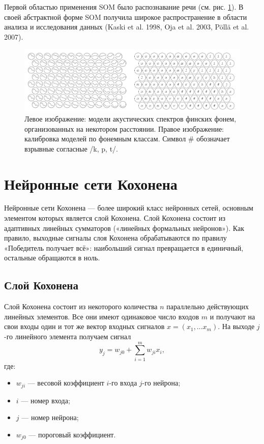 \documentclass[a4paper,12pt]{article}
\begin{document}
Первой областью применения SOM было распознавание речи (см. рис. \ref{fig:phonemesom}). В своей абстрактной форме SOM получила широкое распространение в области анализа и исследования данных (Kaski et al. 1998, Oja et al. 2003, Pöllä et al. 2007).\cite{scholarpedia}

\begin{figure}[h]
  \includegraphics[width=\textwidth]{Phonemesom.png}
  \caption{Левое изображение: модели акустических спектров финских фонем, организованных на некотором расстоянии.
  Правое изображение: калибровка моделей по фонемным классам. Символ \# обозначает взрывные согласные /k, p, t/.}
  \centering
  \label{fig:phonemesom}
\end{figure}

\section{Нейронные сети Кохонена}

Нейронные сети Кохонена — более широкий класс нейронных сетей, основным элементом которых является слой Кохонена. Слой Кохонена состоит из адаптивных линейных сумматоров («линейных формальных нейронов»). Как правило, выходные сигналы слоя Кохонена обрабатываются по правилу «Победитель получает всё»: наибольший сигнал превращается в единичный, остальные обращаются в ноль.

\subsection{Слой Кохонена}

Слой Кохонена состоит из некоторого количества $n$ параллельно действующих линейных элементов. Все они имеют одинаковое число входов $m$ и получают на свои входы один и тот же вектор входных сигналов $x=(x_{1},...x_{m})$. На выходе $j$-го линейного элемента получаем сигнал 
\[
  y_{j}=w_{{j0}}+\sum _{{i=1}}^{m}w_{{ji}}x_{i},
\]
где:
\begin{itemize}
  \setlength\itemsep{0em}
  \item $w_{{ji}}$ — весовой коэффициент $i$-го входа $j$-го нейрона;
  \item $i$ — номер входа;
  \item $j$ — номер нейрона;
  \item $w_{{j0}}$ — пороговый коэффициент.
\end{itemize}
\end{document}
